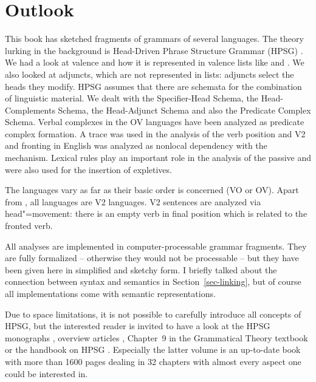 
\chapter{Outlook}
\label{chap-outlook}

This book has sketched fragments of grammars of several  languages. The theory lurking in the
background is Head-Driven Phrase Structure Grammar (HPSG)\indexhpsg
\parencites{ps}{ps2}{MuellerLehrbuch3}{HPSGHandbook}. We had a look at valence and how it is
represented in valence lists like \spr and \comps. We also looked at adjuncts, which are not
represented in lists: adjuncts select the heads they modify. HPSG assumes that there are schemata
for the combination of linguistic material. We dealt with the Specifier-Head Schema, the
Head-Complements Schema, the Head-Adjunct Schema and also the Predicate Complex Schema. Verbal
complexes in the  OV languages have been analyzed as predicate complex formation.
A trace was used in the analysis of the verb position and V2 and fronting in English was analyzed as
nonlocal dependency with the \slasch mechanism. Lexical rules play an important role in the analysis
of the passive and were also used for the insertion of expletives.

The  languages vary as far as their basic order is concerned (VO or OV). Apart from ,
all  languages are V2 languages. V2 sentences are analyzed via head"=movement: there is an
empty verb in final position which is related to the fronted verb.

All analyses are implemented in computer-processable grammar fragments. They are fully formalized –
otherwise they would not be processable – but they have been given here in simplified and sketchy
form. I briefly talked about the connection between syntax and semantics in Section~\ref{sec-linking}, but of
course all implementations come with semantic representations.

Due to space limitations, it is not possible to carefully introduce all concepts of HPSG, but the
interested reader is invited to have a look at the HPSG monographs
\parencites{ps}{ps2}{GSag2000a-u}{MuellerLehrbuch3}, overview articles
\parencites{LM2006a}{PK2006a-u}{Bildhauer2014a-u}{MuellerHPSGHandbook,MuellerCurrentApproaches}, Chapter~9 in
the Grammatical Theory textbook \citep{MuellerGT-Eng5} or the handbook on HPSG
\citep{HPSGHandbook}. Especially the latter volume is an up-to-date book with more than 1600 pages
dealing in 32 chapters with almost every aspect one could be interested in.







